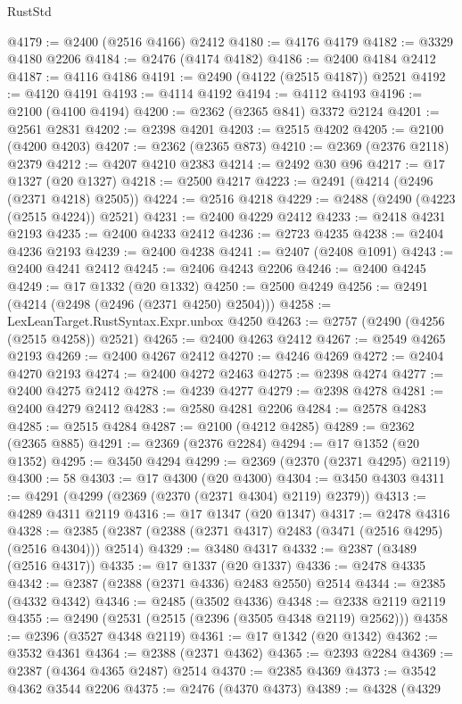 \begin{lexlean}{RustStd}
\begin{coremodule}
{\begin{coremodule}
{{{{{{{{{{{{{{{{{{{{{{{{{{{{{{{{{{{{{{{{{{{{{{{{{{@4179 := @2400 (@2516 @4166) @2412
@4180 := @4176 @4179
@4182 := @3329 @4180 @2206
@4184 := @2476 (@4174 @4182)
@4186 := @2400 @4184 @2412
@4187 := @4116 @4186
@4191 := @2490 (@4122 (@2515 @4187)) @2521
@4192 := @4120 @4191
@4193 := @4114 @4192
@4194 := @4112 @4193
@4196 := @2100 (@4100 @4194)
@4200 := @2362 (@2365 @841) @3372 @2124
@4201 := @2561 @2831
@4202 := @2398 @4201
@4203 := @2515 @4202
@4205 := @2100 (@4200 @4203)
@4207 := @2362 (@2365 @873)
@4210 := @2369 (@2376 @2118) @2379
@4212 := @4207 @4210 @2383
@4214 := @2492 @30 @96
@4217 := @17 @1327 (@20 @1327)
@4218 := @2500 @4217
@4223 := @2491 (@4214 (@2496 (@2371 @4218) @2505))
@4224 := @2516 @4218
@4229 := @2488 (@2490 (@4223 (@2515 @4224)) @2521)
@4231 := @2400 @4229 @2412
@4233 := @2418 @4231 @2193
@4235 := @2400 @4233 @2412
@4236 := @2723 @4235
@4238 := @2404 @4236 @2193
@4239 := @2400 @4238
@4241 := @2407 (@2408 @1091)
@4243 := @2400 @4241 @2412
@4245 := @2406 @4243 @2206
@4246 := @2400 @4245
@4249 := @17 @1332 (@20 @1332)
@4250 := @2500 @4249
@4256 := @2491 (@4214 (@2498 (@2496 (@2371 @4250) @2504)))
@4258 := LexLeanTarget.RustSyntax.Expr.unbox @4250
@4263 := @2757 (@2490 (@4256 (@2515 @4258)) @2521)
@4265 := @2400 @4263 @2412
@4267 := @2549 @4265 @2193
@4269 := @2400 @4267 @2412
@4270 := @4246 @4269
@4272 := @2404 @4270 @2193
@4274 := @2400 @4272 @2463
@4275 := @2398 @4274
@4277 := @2400 @4275 @2412
@4278 := @4239 @4277
@4279 := @2398 @4278
@4281 := @2400 @4279 @2412
@4283 := @2580 @4281 @2206
@4284 := @2578 @4283
@4285 := @2515 @4284
@4287 := @2100 (@4212 @4285)
@4289 := @2362 (@2365 @885)
@4291 := @2369 (@2376 @2284)
@4294 := @17 @1352 (@20 @1352)
@4295 := @3450 @4294
@4299 := @2369 (@2370 (@2371 @4295) @2119)
@4300 := 58
@4303 := @17 @4300 (@20 @4300)
@4304 := @3450 @4303
@4311 := @4291 (@4299 (@2369 (@2370 (@2371 @4304) @2119) @2379))
@4313 := @4289 @4311 @2119
@4316 := @17 @1347 (@20 @1347)
@4317 := @2478 @4316
@4328 := @2385 (@2387 (@2388 (@2371 @4317) @2483 (@3471 (@2516 @4295) (@2516 @4304))) @2514)
@4329 := @3480 @4317
@4332 := @2387 (@3489 (@2516 @4317))
@4335 := @17 @1337 (@20 @1337)
@4336 := @2478 @4335
@4342 := @2387 (@2388 (@2371 @4336) @2483 @2550) @2514
@4344 := @2385 (@4332 @4342)
@4346 := @2485 (@3502 @4336)
@4348 := @2338 @2119 @2119
@4355 := @2490 (@2531 (@2515 (@2396 (@3505 @4348 @2119) @2562)))
@4358 := @2396 (@3527 @4348 @2119)
@4361 := @17 @1342 (@20 @1342)
@4362 := @3532 @4361
@4364 := @2388 (@2371 @4362)
@4365 := @2393 @2284
@4369 := @2387 (@4364 @4365 @2487) @2514
@4370 := @2385 @4369
@4373 := @3542 @4362 @3544 @2206
@4375 := @2476 (@4370 @4373)
@4389 := @4328
    (@4329
}}}}}}}}}}}}}}}}}}}}}}}}}}}}}}}}}}}}}}}}}}}}}}}}}}
\end{coremodule}}
\end{coremodule}
\end{lexlean}
